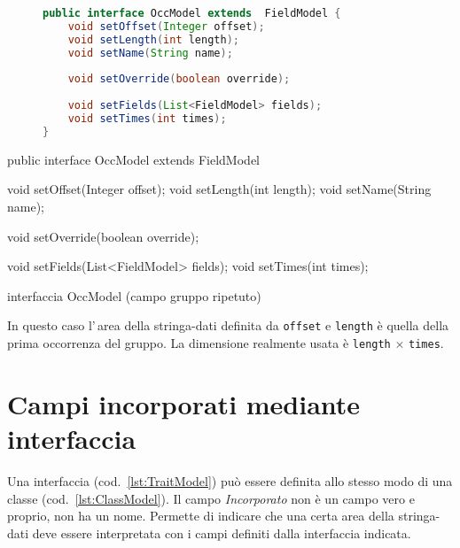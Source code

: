 \ifesource
\begin{figure*}[!htb]
\begin{lstlisting}[language=java, 
caption=interfaccia OccModel (campo gruppo ripetuto), 
label=lst:OccModel]
public interface OccModel extends  FieldModel {
    void setOffset(Integer offset);
    void setLength(int length);
    void setName(String name);
    
    void setOverride(boolean override);
    
    void setFields(List<FieldModel> fields);
    void setTimes(int times);
}
\end{lstlisting}
\end{figure*}
\else
\begin{elisting}[!htb]
\begin{javacode}
public interface OccModel extends  FieldModel {
    void setOffset(Integer offset);
    void setLength(int length);
    void setName(String name);
    
    void setOverride(boolean override);
    
    void setFields(List<FieldModel> fields);
    void setTimes(int times);
}
\end{javacode}
\caption{interfaccia OccModel (campo gruppo ripetuto)}
\label{lst:OccModel}
\end{elisting}
\fi

In questo caso l'\,area della stringa-dati definita da \verb!offset! e 
\verb!length! è quella della prima occorrenza del gruppo. La dimensione realmente
usata è \verb!length! $\times$ \verb!times!.

\section{Campi incorporati mediante interfaccia}
Una interfaccia (cod.~\ref{lst:TraitModel}) può essere definita allo stesso modo
di una classe (cod.~\ref{lst:ClassModel}).
Il campo \textsl{Incorporato} non è un campo vero e proprio, non ha un nome.
Permette di indicare che una certa area della stringa-dati deve essere 
interpretata con i campi definiti dalla interfaccia indicata.

